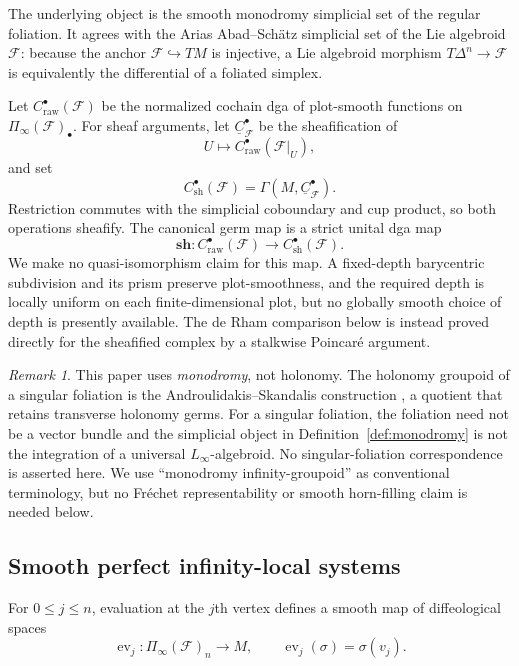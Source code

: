 \documentclass[12pt]{amsart}
\theoremstyle{definition}
\theoremstyle{remark}
\newtheorem{rem}[thm]{Remark}
\numberwithin{equation}{section}
\newcommand{\CF}{{\mathcal F}}
\newcommand{\1}{{\mathbb{1}}}
\newcommand{\ev}{\operatorname{ev}}
\begin{document}
The underlying object is the smooth monodromy simplicial set of the
regular foliation.  It agrees with the Arias Abad--Sch\"atz simplicial
set of the Lie algebroid $\CF$: because the anchor
$\CF\hookrightarrow TM$ is injective, a Lie algebroid morphism
$T\Delta^n\to\CF$ is equivalently the differential of a foliated
simplex.

Let $C^\bullet_{\mathrm{raw}}(\CF)$ be the normalized cochain dga of
plot-smooth functions on $\Pi_{\infty}(\CF)_\bullet$.  For sheaf
arguments, let $\underline C^\bullet_{\CF}$ be the sheafification of
\[
 U\longmapsto C^\bullet_{\mathrm{raw}}(\CF|_U),
\]
and set
\[
 C^\bullet_{\mathrm{sh}}(\CF)
 =\Gamma(M,\underline C^\bullet_{\CF}).
\]
Restriction commutes with the simplicial coboundary and cup product, so
both operations sheafify.  The canonical germ map is a strict unital
dga map
\begin{equation}\label{eq:scalar-germ-map}
 \mathbf{sh}:
 C^\bullet_{\mathrm{raw}}(\CF)
 \longrightarrow C^\bullet_{\mathrm{sh}}(\CF).
\end{equation}
We make no quasi-isomorphism claim for this map.  A fixed-depth
barycentric subdivision and its prism preserve plot-smoothness, and
the required depth is locally uniform on each finite-dimensional
plot, but no globally smooth choice of depth is presently available.
The de Rham comparison below is instead proved directly for the
sheafified complex by a stalkwise Poincar\'e argument.

\begin{rem}\label{rem:mon-hol}
This paper uses \emph{monodromy}, not holonomy.  The holonomy groupoid
of a singular foliation is the Androulidakis--Skandalis construction
\cite{AS06}, a quotient that retains transverse holonomy germs.  For a
singular foliation, the foliation need not be a vector bundle and the simplicial
object in Definition~\ref{def:monodromy} is not the integration of a
universal $L_{\infty}$-algebroid.  No singular-foliation correspondence
is asserted here.  We use ``monodromy infinity-groupoid'' as conventional
terminology, but no Fr\'echet representability or smooth horn-filling
claim is needed below.
\end{rem}

\subsection{Smooth perfect infinity-local systems}

For $0\leq j\leq n$, evaluation at the $j$th vertex defines a smooth
map of diffeological spaces
\[
 \ev_j:\Pi_{\infty}(\CF)_n\longrightarrow M,
 \qquad
 \ev_j(\sigma)=\sigma(v_j).
\]
\end{document}
